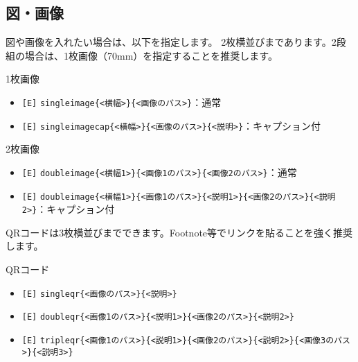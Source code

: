 \begin{multicols*}{2}
\section{図・画像}
図や画像を入れたい場合は、以下を指定します。
2枚横並びまであります。2段組の場合は、1枚画像（70mm）を指定することを推奨します。
\begin{framebox-simple}{1枚画像}
    \begin{itemize}
        \item \verb|[E]| \verb|singleimage{<横幅>}{<画像のパス>}|：通常
        \item \verb|[E]| \verb|singleimagecap{<横幅>}{<画像のパス>}{<説明>}|：キャプション付
    \end{itemize}
\end{framebox-simple}
\begin{framebox-simple}{2枚画像}
    \begin{itemize}
        \item \verb|[E]| \verb|doubleimage{<横幅1>}{<画像1のパス>}{<画像2のパス>}|：通常
        \item \verb|[E]| \verb|doubleimage{<横幅1>}{<画像1のパス>}{<説明1>}{<画像2のパス>}{<説明2>}|：キャプション付
    \end{itemize}
\end{framebox-simple}
QRコードは3枚横並びまでできます。Footnote等でリンクを貼ることを強く推奨します。
\begin{framebox-simple}{QRコード}
    \begin{itemize}
        \item \verb|[E]| \verb|singleqr{<画像のパス>}{<説明>}|
        \item \verb|[E]| \verb|doubleqr{<画像1のパス>}{<説明1>}{<画像2のパス>}{<説明2>}|
        \item \verb|[E]| \verb|tripleqr{<画像1のパス>}{<説明1>}{<画像2のパス>}{<説明2>}{<画像3のパス>}{<説明3>}|
    \end{itemize}
\end{framebox-simple}


\end{multicols*}
